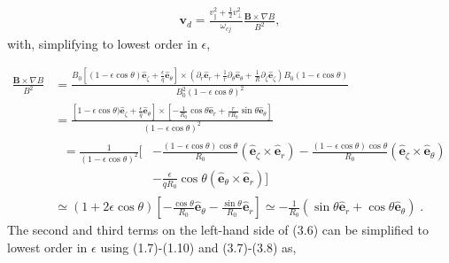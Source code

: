 \documentclass[12pt]{article}
\numberwithin{equation}{section}
\begin{document}
   \begin{equation}
   \begin{aligned}
      \bm{v}_d = \frac{v_\parallel^2 + \frac{1}{2} v_\perp^2}{\omega_{cj}}\frac{\bm{B}\times\nabla B}{B^2},
   \end{aligned}
   \end{equation}
with, simplifying to lowest order in $\epsilon$,
   
   \begin{equation}
   \begin{aligned}
      \frac{\bm{B}\times\nabla B}{B^2} &= \frac{B_0[(1-\epsilon\cos\theta)\bm{\hat{e}}_\zeta + \frac{\epsilon}{q}\bm{\hat{e}}_\theta]
      \times(\partial_r\bm{\hat{e}}_r + \frac{1}{r}\partial_\theta\bm{\hat{e}}_\theta + \frac{1}{R}\partial_\zeta\bm{\hat{e}}_\zeta)
      B_0(1-\epsilon\cos\theta)}{B_0^2(1-\epsilon\cos\theta)^2} \\ &=
      \frac{[1-\epsilon\cos\theta)\bm{\hat{e}}_\zeta + \frac{\epsilon}{q}\bm{\hat{e}}_\theta]
      \times[-\frac{1}{R_0}\cos\theta\bm{\hat{e}}_r + \frac{r}{r R_0}\sin\theta\bm{\hat{e}}_\theta]}{(1-\epsilon\cos\theta)^2} \\ &
      \begin{aligned}
         \;= \frac{1}{(1-\epsilon\cos\theta)^2}[&-\frac{(1-\epsilon\cos\theta)\cos\theta}{R_0}(\bm{\hat{e}}_\zeta\times\bm{\hat{e}}_r)
                                               -\frac{(1-\epsilon\cos\theta)\cos\theta}{R_0}(\bm{\hat{e}}_\zeta\times\bm{\hat{e}}_\theta) \\
                                              &-\frac{\epsilon}{q R_0}\cos\theta(\bm{\hat{e}}_\theta\times\bm{\hat{e}}_r)]
      \end{aligned}         
      \\ &\simeq (1+2\epsilon\cos\theta)[-\frac{\cos\theta}{R_0}\bm{\hat{e}}_\theta-\frac{\sin\theta}{R_0}\bm{\hat{e}}_r]
          \simeq -\frac{1}{R_0}(\sin\theta\bm{\hat{e}}_r + \cos\theta\bm{\hat{e}}_\theta)\;.
   \end{aligned}
   \end{equation}
The second and third terms on the left-hand side of (3.6) can be simplified to lowest order in $\epsilon$ using (1.7)-(1.10) and
(3.7)-(3.8) as,
   
\end{document}
